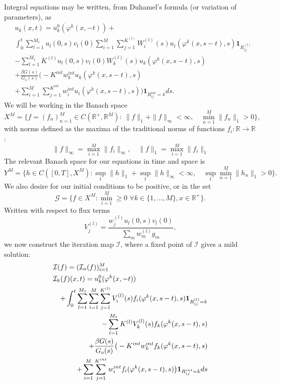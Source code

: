 Integral equations may be written, from Duhamel's formula (or variation of parameters), as
\begin{align}\label{mild}
&u_k(x,t)= u_k^0(\varphi^k(x,-t))+\\ &\int_0^t \sum_{l = 1}^{M_1}u_l(0,s)v_{l}(0)\sum_{i = 1}^{M}\sum_{j= 1}^{K^{(l)}} W^{(l)}_i(s)u_i(\varphi^k(x,s-t),s)\mathbf{1}_{R^{(l)}_{ij}} \nonumber\\
&-\sum_{l = 1}^{M_1}K^{(l)}u_l(0,s)v_{l}(0)W^{(l)}_k(s)u_k(\varphi^k(x,s-t),s)\nonumber\\&+\frac{\beta G(s)}{G_o(s)}\big( -K^{int}w^{int}_ku_{k}(\varphi^k(x,s-t),s)\nonumber
\\&+  \sum_{i = 1}^{M}\sum_{j= 1}^{K^{int}} w^{int}_iu_{i}(\varphi^k(x,s-t),s)\big)\mathbf{1}_{R^{int}_{ij} = k}ds. \nonumber 
\end{align}
We will be working in the Banach space
\begin{equation}
X^M = \{ f= (f_n)^M_{n= 1}\in C(\mathbb{R}^+,\mathbb R^M):\  \|f\|_1+\|f\|_\infty<\infty, \quad \min_{n= 1}^M\|f_n\|_1>0\},
\end{equation}
with norms defined as the maxima of the traditional norms of functions $f_i: \mathbb R\rightarrow \mathbb R$:  
\begin{equation}
\|f\|_\infty = \max_{i = 1}^M \|f_i\|_\infty, \quad \|f\|_1 = \max_{i = 1}^M \|f_i\|_1
\end{equation}
The relevant Banach space for our equations  in time and space is \begin{equation}
Y^M = \{h\in C([0,T],X^M): \sup_t \|h\|_1+\sup_t \|h\|_\infty  < \infty,\quad \sup_t \min_{n= 1}^M\|h_n\|_1>0\}.
\end{equation}
We also desire for our initial conditions to be positive, or in the set  
\begin{equation}
\mathcal G = \{f \in X^M: \min_{i = 1}^ M\ge 0 \hspace{4pt}\forall k\in \{1, \dots, M\}, x\in \mathbb{R}^+\}.
\end{equation}
Written with respect to flux terms
\begin{equation}
V_{j}^{(l)}= \frac{w^{(l)}_ju_l(0,s)v_{l}(0)}{\sum_m w_m^{(l)} g_m},
\end{equation}
we now construct the iteration map $\mathcal I$, where a fixed point of $\mathcal I$ gives a mild solution:
\begin{eqnarray}
\lefteqn{\mathcal I(f) = (\mathcal I_n(f))_{i = 1}^M} \\
\lefteqn{\mathcal I_k(f)(x,t)= u_k^0(\varphi^k(x,-t))}\nonumber\\&&+\int_0^t \sum_{l = 1}^{M_1}\sum_{i = 1}^{M}\sum_{j= 1}^{K^{(l)}} V^{(l)}_i(s)f_i(\varphi^k(x,s-t),s)\mathbf{1}_{R^{(l)}_{ij}=k}\nonumber \\&&-\sum_{l = 1}^{M_1}K^{(l)}V^{(l)}_k(s)f_k(\varphi^k(x,s-t),s)\nonumber\\
&&+\frac{\beta G(s)}{G_o(s)}\big( -K^{int}w^{int}_kf_{k}(\varphi^k(x,s-t),s)\nonumber
\\&&  +\sum_{i = 1}^{M}\sum_{j= 1}^{K^{int}} w^{int}_if_{i}(\varphi^k(x,s-t),s)\big)\mathbf{1}_{R^{int}_{ij} = k}ds \nonumber \end{eqnarray}
